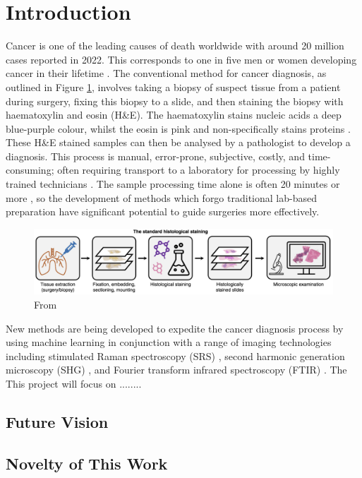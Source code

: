 \section{Introduction}
\noindent
Cancer is one of the leading causes of death worldwide with around 20 million cases reported in 2022. This corresponds to one in five men or women developing cancer in their lifetime \cite{bray_global_2024}. The conventional method for cancer diagnosis, as outlined in Figure \ref{fig:hist-summary}, involves taking a biopsy of suspect tissue from a patient during surgery, fixing this biopsy to a slide, and then staining the biopsy with haematoxylin and eosin (H\&E). The haematoxylin stains nucleic acids a deep blue-purple colour, whilst the eosin is pink and non-specifically stains proteins \cite{fischer_hematoxylin_2008}. These H\&E stained samples can then be analysed by a pathologist to develop a diagnosis. This process is manual, error-prone, subjective, costly, and time-consuming; often requiring transport to a laboratory for processing by highly trained technicians \cite{hollon_near_2020}. The sample processing time alone is often 20 minutes or more \cite{novis_interinstitutional_1997}, so the development of methods which forgo traditional lab-based preparation have significant potential to guide surgeries more effectively. 

\begin{figure}[htbp]
  \centering
  \includegraphics[width=1\textwidth]{Images/Histology_Summary.png}
  \caption{From \cite{bai_deep_2023}}
  \label{fig:hist-summary}
\end{figure}

New methods are being developed to expedite the cancer diagnosis process by using machine learning in conjunction with a range of imaging technologies including stimulated Raman spectroscopy (SRS) \cite{hollon_near_2020, sarri_fast_2019, kondepudi_foundation_2024, jiang_opensrh_2022}, second harmonic generation microscopy (SHG) \cite{sarri_fast_2019}, and Fourier transform infrared spectroscopy (FTIR) \cite{tomas_detection_2022, berisha_deep_2019}. The This project will focus on ........
\subsection{Future Vision}
\subsection{Novelty of This Work}